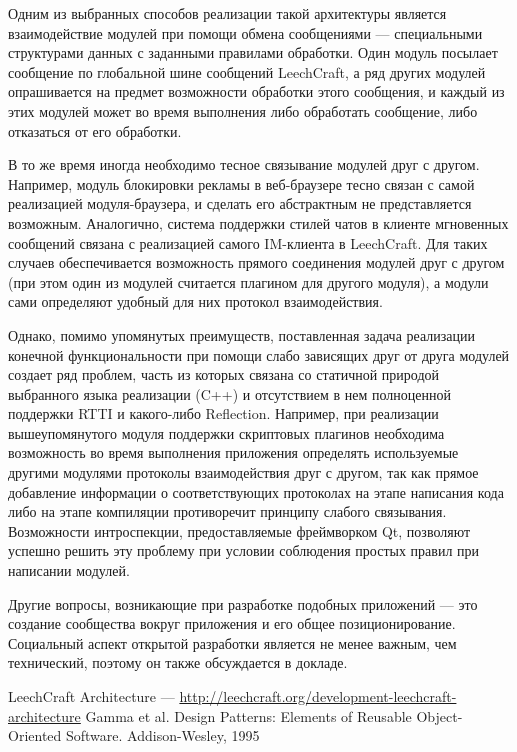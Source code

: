 \documentclass[10pt, a5paper]{article}
\begin{document}
Одним из выбранных способов реализации такой архитектуры является
взаимодействие модулей при помощи обмена сообщениями --- специальными
структурами данных с заданными правилами обработки. Один модуль
посылает сообщение по глобальной шине сообщений LeechCraft, а ряд других
модулей опрашивается на предмет возможности обработки этого сообщения,
и каждый из этих модулей может во время выполнения либо обработать
сообщение, либо отказаться от его обработки.

В то же время иногда необходимо тесное связывание модулей друг с
другом. Например, модуль блокировки рекламы в веб-браузере тесно
связан с самой реализацией модуля-браузера, и сделать его
абстрактным не представляется возможным. Аналогично, система
поддержки стилей чатов в клиенте мгновенных сообщений связана с
реализацией самого IM-клиента в LeechCraft. Для таких случаев
обеспечивается возможность прямого соединения модулей друг с
другом (при этом один из модулей считается плагином для другого
модуля), а модули сами определяют удобный для них протокол
взаимодействия.

Однако, помимо упомянутых преимуществ, поставленная задача
реализации конечной функциональности при помощи слабо зависящих друг
от друга модулей создает ряд проблем, часть из которых связана со
статичной природой выбранного языка реализации (C++) и отсутствием в
нем полноценной поддержки RTTI и какого-либо Reflection. Например, при
реализации вышеупомянутого модуля поддержки скриптовых плагинов
необходима возможность во время выполнения приложения определять
используемые другими модулями протоколы взаимодействия друг с другом,
так как прямое добавление информации о соответствующих протоколах на
этапе написания кода либо на этапе компиляции противоречит принципу
слабого связывания. Возможности интроспекции, предоставляемые
фреймворком Qt, позволяют успешно решить эту проблему при условии
соблюдения простых правил при написании модулей.

Другие вопросы, возникающие при разработке подобных приложений --- это
создание сообщества вокруг приложения и его общее позиционирование.
Социальный аспект открытой разработки является не менее важным, чем
технический, поэтому он также обсуждается в докладе.

\begin{thebibliography}{9}
	 LeechCraft Architecture --- \url{http://leechcraft.org/development-leechcraft-architecture}
	 Gamma et al. Design Patterns: Elements of Reusable Object-Oriented Software. Addison-Wesley, 1995
\end{thebibliography}
\end{document}

